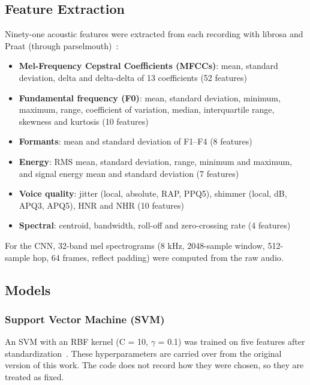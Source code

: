 \documentclass{paper}
\begin{document}
\subsection{Feature Extraction}
Ninety-one acoustic features were extracted from each recording with librosa and Praat (through parselmouth)~\cite{baken1987clinical}:

\begin{itemize}
    \item \textbf{Mel-Frequency Cepstral Coefficients (MFCCs)}: mean, standard deviation, delta and delta-delta of 13 coefficients (52 features)
    \item \textbf{Fundamental frequency (F0)}: mean, standard deviation, minimum, maximum, range, coefficient of variation, median, interquartile range, skewness and kurtosis (10 features)
    \item \textbf{Formants}: mean and standard deviation of F1--F4 (8 features)
    \item \textbf{Energy}: RMS mean, standard deviation, range, minimum and maximum, and signal energy mean and standard deviation (7 features)
    \item \textbf{Voice quality}: jitter (local, absolute, RAP, PPQ5), shimmer (local, dB, APQ3, APQ5), HNR and NHR (10 features)
    \item \textbf{Spectral}: centroid, bandwidth, roll-off and zero-crossing rate (4 features)
\end{itemize}

For the CNN, 32-band mel spectrograms (8 kHz, 2048-sample window, 512-sample hop, 64 frames, reflect padding) were computed from the raw audio.

\subsection{Models}

\subsubsection{Support Vector Machine (SVM)}
An SVM with an RBF kernel (C = 10, $\gamma$ = 0.1) was trained on five features after standardization~\cite{hastie2009elements}. These hyperparameters are carried over from the original version of this work. The code does not record how they were chosen, so they are treated as fixed.
\end{document}
